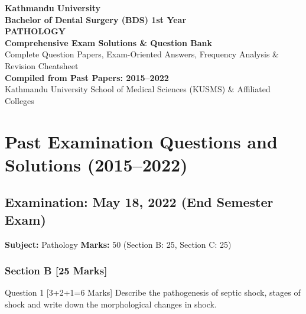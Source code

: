 \documentclass[11pt,a4paper]{article}
\begin{document}
\begin{titlepage}
    \centering
    \vspace*{2cm}
    {\Huge \textbf{Kathmandu University}}\\[0.5cm]
    {\LARGE \textbf{Bachelor of Dental Surgery (BDS) 1st Year}}\\[1.5cm]
    {\Huge \textbf{PATHOLOGY}}\\[0.8cm]
    {\Large \textbf{Comprehensive Exam Solutions \& Question Bank}}\\[0.5cm]
    {\large Complete Question Papers, Exam-Oriented Answers, Frequency Analysis \& Revision Cheatsheet}\\[2cm]
    \vfill
    {\large \textbf{Compiled from Past Papers: 2015--2022}}\\[0.5cm]
    {\small Kathmandu University School of Medical Sciences (KUSMS) \& Affiliated Colleges}
    \vspace*{1.5cm}
\end{titlepage}

\tableofcontents
\newpage

\section{Past Examination Questions and Solutions (2015--2022)}

\subsection{Examination: May 18, 2022 (End Semester Exam)}
\textbf{Subject:} Pathology \quad \textbf{Marks:} 50 (Section B: 25, Section C: 25)

\subsubsection{Section B [25 Marks]}

\begin{qbox}{Question 1 [3+2+1=6 Marks]}
Describe the pathogenesis of septic shock, stages of shock and write down the morphological changes in shock.
\end{qbox}
\end{document}
